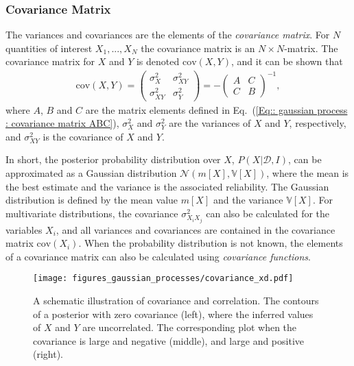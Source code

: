 \documentclass[twoside,english]{uiofysmaster}
\begin{document}
{{\subsubsection{Covariance Matrix}

The variances and covariances are the elements of the \textit{covariance matrix}. For $N$ quantities of interest $X_1, ...,X_N$ the covariance matrix is an $N \times N$-matrix. The covariance matrix for $X$ and $Y$ is denoted $\text{cov}(X,Y)$, and it can be shown that \cite{sivia2006data}
\begin{align}
\text{cov}(X,Y) = 
\begin{pmatrix}
\sigma_X^2 & \sigma_{XY}^2\\
\sigma_{XY}^2 & \sigma_Y^2
\end{pmatrix}
= - \begin{pmatrix}
A & C\\
C & B
\end{pmatrix}^{-1},
\end{align}
where $A$, $B$ and $C$ are the matrix elements defined in Eq.~(\ref{Eq:: gaussian process : covariance matrix ABC}),  $\sigma_X^2$ and $\sigma_Y^2$ are the variances of $X$ and $Y$, respectively, and $\sigma_{XY}^2$ is the covariance of $X$ and $Y$.

In short, the posterior probability distribution over $X$, $P(X | \mathcal{D}, I)$, can be approximated as a Gaussian distribution $\mathcal{N}(m[X], \mathbb{V}[X])$, where the mean is the best estimate and the variance is the associated reliability. The Gaussian distribution is defined by the mean value $m[X]$ and the variance $\mathbb{V}[X]$. For multivariate distributions, the covariance $\sigma_{X_i X_j}^2$ can also be calculated for the variables $X_i$, and all variances and covariances are contained in the covariance matrix $\text{cov}(X_i)$. When the probability distribution is not known, the elements of a covariance matrix can also be calculated using \textit{covariance functions}.

\begin{figure}
\centering
\texttt{[image: figures\_gaussian\_processes/covariance\_xd.pdf]}
\caption{A schematic illustration of covariance and correlation. The contours of a posterior with zero covariance (left), where the inferred values of $X$ and $Y$ are uncorrelated. The corresponding plot when the covariance is large and negative (middle), and large and positive (right).}
\label{Fig:: gaussian process : Covariance illustrated}
\end{figure}


}}
\end{document}
